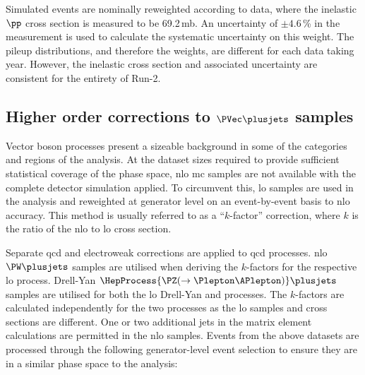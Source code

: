 Simulated events are nominally reweighted according to data, where the inelastic $\pp$ cross section is measured to be 69.2\,mb. An uncertainty of $\pm \text{4.6}$\,\% in the measurement is used to calculate the systematic uncertainty on this weight. The pileup distributions, and therefore the weights, are different for each data taking year. However, the inelastic cross section and associated uncertainty are consistent for the entirety of Run-2.





\subsection{Higher order corrections to \texorpdfstring{$\PVec \plusjets$}{V plus jets} samples}
\label{subsec:htoinv_nlo_corrs}

Vector boson \plusjets processes present a sizeable background in some of the categories and regions of the analysis. At the dataset sizes required to provide sufficient statistical coverage of the phase space, \acrshort{nlo} \acrshort{mc} samples are not available with the complete detector simulation applied. To circumvent this, \acrshort{lo} samples are used in the analysis and reweighted at generator level on an event-by-event basis to \acrshort{nlo} accuracy. This method is usually referred to as a ``$k$-factor'' correction, where $k$ is the ratio of the \acrshort{nlo} to \acrshort{lo} cross section.

Separate \acrshort{qcd} and electroweak corrections are applied to \acrshort{qcd} processes. \acrshort{nlo} $\PW \plusjets$ samples are utilised when deriving the $k$-factors for the respective \acrshort{lo} process. Drell-Yan $\HepProcess{\PZ (\to \Plepton\APlepton)} \plusjets$ samples are utilised for both the \acrshort{lo} Drell-Yan and \ztonunupjets processes. The $k$-factors are calculated independently for the two processes as the \acrshort{lo} samples and cross sections are different. One or two additional \glspl{jet} in the matrix element calculations are permitted in the \acrshort{nlo} samples. Events from the above datasets are processed through the following generator-level event selection to ensure they are in a similar phase space to the analysis:

